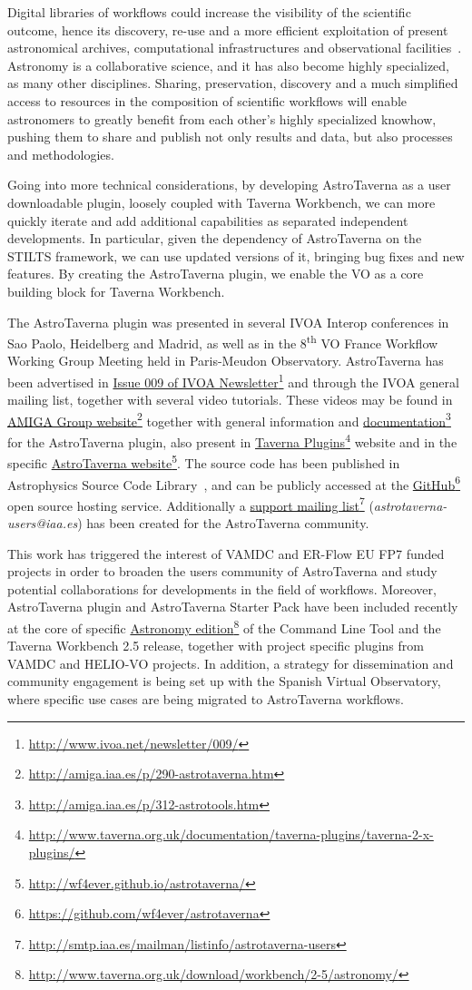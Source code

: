 \documentclass[final,authoryear,5p,times,twocolumn]{elsarticle}
\newcommand{\urlsamefont}[1]{\urlstyle{same}\url{#1}}
\newcommand{\hrefnote}[2]{\href{#1}{#2}\footnote{\urlsamefont{#1}}}
\begin{document}
Digital libraries of workflows could increase the visibility of the scientific outcome, hence its discovery, re-use and a more efficient exploitation of present astronomical archives, computational infrastructures and observational facilities~\citep{Ruiz2012}. Astronomy is a collaborative science, and it has also become highly specialized, as many other disciplines. Sharing, preservation, discovery and a much simplified access to resources in the composition of scientific workflows will enable astronomers to greatly benefit from each other’s highly specialized knowhow, pushing them to share and publish not only results and data, but also processes and methodologies.

Going into more technical considerations, by developing AstroTaverna as a user downloadable plugin, loosely coupled with Taverna Workbench, we can more quickly iterate and add additional capabilities as separated independent developments. In particular, given the dependency of AstroTaverna on the STILTS framework, we can use updated versions of it, bringing bug fixes and new features. By creating the AstroTaverna plugin, we enable the VO as a core building block for Taverna Workbench.

The AstroTaverna plugin was presented in several IVOA Interop conferences in Sao Paolo, Heidelberg and Madrid, as well as in the 8\textsuperscript{th} VO France Workflow Working Group Meeting held in Paris-Meudon Observatory. AstroTaverna has been advertised in \hrefnote{http://www.ivoa.net/newsletter/009/}{Issue 009 of IVOA Newsletter} and through the IVOA general mailing list, together with several video tutorials. These videos may be found in \hrefnote{http://amiga.iaa.es/p/290-astrotaverna.htm}{AMIGA Group website} together with general information and \hrefnote{http://amiga.iaa.es/p/312-astrotools.htm}{documentation} for the AstroTaverna plugin, also present in \hrefnote{http://www.taverna.org.uk/documentation/taverna-plugins/taverna-2-x-plugins/}{Taverna Plugins} website and in the specific \hrefnote{http://wf4ever.github.io/astrotaverna/}{AstroTaverna website}. The source code has been published in Astrophysics Source Code Library~\citep[ASCL; see][]{Garrido2013}, and can be publicly accessed at the \hrefnote{https://github.com/wf4ever/astrotaverna}{GitHub} open source hosting service. Additionally a \hrefnote{http://smtp.iaa.es/mailman/listinfo/astrotaverna-users}{support mailing list} (\textit{astrotaverna-users@iaa.es}) has been created for the AstroTaverna community. 

This work has triggered the interest of VAMDC and ER-Flow EU FP7 funded projects in order to broaden the users community of AstroTaverna and study potential collaborations for developments in the field of workflows. Moreover, AstroTaverna plugin and AstroTaverna Starter Pack have been included recently at the core of specific \hrefnote{http://www.taverna.org.uk/download/workbench/2-5/astronomy/}{Astronomy edition} of the Command Line Tool and the Taverna Workbench 2.5 release, together with project specific plugins from VAMDC and HELIO-VO projects. In addition, a strategy for dissemination and community engagement is being set up with the Spanish Virtual Observatory, where specific use cases are being migrated to AstroTaverna workflows. 
\end{document}
